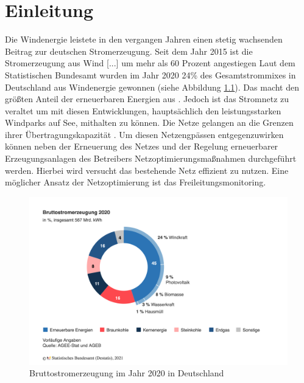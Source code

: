 \documentclass[
12pt, %
toc=listofnumbered, %
toc=chapterentrydotfill, %
numbers=noenddot, %
captions=tableheading, %
bibliography=numbered
]{scrreprt}
\newcommand{\qm}[1]{\glqq#1\grqq{}} %
\begin{document}
\tableofcontents
\chapter{Einleitung}

Die Windenergie leistete in den vergangen Jahren einen stetig wachsenden Beitrag zur deutschen Stromerzeugung. 
Seit dem Jahr 2015 \qm{ist die Stromerzeugung aus Wind [...] um mehr als 60 Prozent angestiegen} \cite{2021_Lewicki_ErneuerbareEnergienZahlen} Laut dem Statistischen Bundesamt wurden im Jahr 2020 24\% des Gesamtstrommixes in Deutschland aus Windenergie gewonnen (siehe Abbildung \ref{fig:strommix_deutschland}). Das macht den größten Anteil der erneuerbaren Energien aus \cite{2021_Lewicki_ErneuerbareEnergienZahlen}. Jedoch ist das Stromnetz zu veraltet um mit diesen Entwicklungen, hauptsächlich den leistungsstarken Windparks auf See, 
mithalten zu können. Die Netze \qm{gelangen an die Grenzen ihrer Übertragungskapazität} \cite{2015_Axthelm_BisFaktenZur}. 
Um diesen Netzengpässen entgegenzuwirken können neben der Erneuerung des Netzes und der Regelung erneuerbarer Erzeugungsanlagen 
des Betreibers Netzoptimierungsmaßnahmen durchgeführt werden. Hierbei wird versucht das bestehende Netz effizient zu nutzen. 
Eine möglicher Ansatz der Netzoptimierung ist das Freileitungsmonitoring.

\begin{figure}[tph]
	\begin{center}
		\includegraphics[width=.8\textwidth]{./images/bruttostromerzeugung-erneuerbare-energien.png}
		\caption{Bruttostromerzeugung im Jahr 2020 in Deutschland}
		\label{fig:strommix_deutschland}
	\end{center}
\end{figure}
\end{document}

